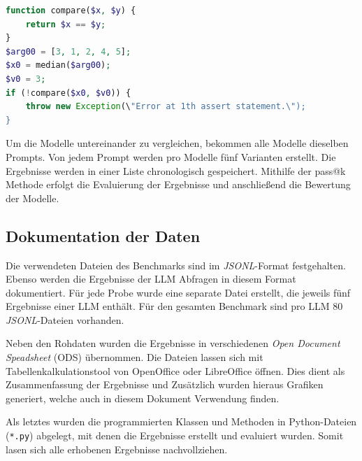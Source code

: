 \begin{lstlisting}[language=php,caption={Beispiel für einen Test aus dem HumanEval-XL Benchmark},label=lst:example_prompt_test_by_humaneval_benchmark]
function compare($x, $y) {
	return $x == $y;
}
$arg00 = [3, 1, 2, 4, 5];
$x0 = median($arg00);
$v0 = 3;
if (!compare($x0, $v0)) {
	throw new Exception(\"Error at 1th assert statement.\");
}
\end{lstlisting}


Um die Modelle untereinander zu vergleichen, bekommen alle Modelle dieselben Prompts. Von jedem Prompt werden pro Modelle fünf Varianten erstellt. Die Ergebnisse werden in einer Liste chronologisch gespeichert. Mithilfe der pass@k Methode erfolgt die Evaluierung der Ergebnisse und anschließend die Bewertung der Modelle.

\subsection{Dokumentation der Daten}
Die verwendeten Dateien des Benchmarks sind im \textit{JSONL}-Format festgehalten. Ebenso werden die Ergebnisse der LLM Abfragen in diesem Format dokumentiert. Für jede Probe wurde eine separate Datei erstellt, die jeweils fünf Ergebnisse einer LLM enthält. Für den gesamten Benchmark sind pro LLM 80 \textit{JSONL}-Dateien vorhanden.\vspace{0.2cm}

Neben den Rohdaten wurden die Ergebnisse in verschiedenen \textit{Open Document Speadsheet} (ODS) übernommen. Die Dateien lassen sich mit Tabellenkalkulationstool von OpenOffice oder LibreOffice öffnen. Dies dient als Zusammenfassung der Ergebnisse und Zusätzlich wurden hieraus Grafiken generiert, welche auch in diesem Dokument Verwendung finden.\vspace{0.2cm}

Als letztes wurden die programmierten Klassen und Methoden in Python-Dateien (\texttt{*.py}) abgelegt, mit denen die Ergebnisse erstellt und evaluiert wurden. Somit lasen sich alle erhobenen Ergebnisse nachvollziehen.



